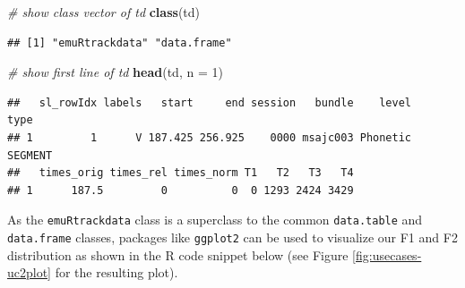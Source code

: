 \documentclass[]{book}
\newenvironment{Shaded}{\begin{snugshade}}{\end{snugshade}}
\newcommand{\CommentTok}[1]{\textcolor[rgb]{0.56,0.35,0.01}{\textit{#1}}}
\newcommand{\DataTypeTok}[1]{\textcolor[rgb]{0.13,0.29,0.53}{#1}}
\newcommand{\DecValTok}[1]{\textcolor[rgb]{0.00,0.00,0.81}{#1}}
\newcommand{\KeywordTok}[1]{\textcolor[rgb]{0.13,0.29,0.53}{\textbf{#1}}}
\newcommand{\NormalTok}[1]{#1}
\newcommand{\OperatorTok}[1]{\textcolor[rgb]{0.81,0.36,0.00}{\textbf{#1}}}
\newcommand{\OtherTok}[1]{\textcolor[rgb]{0.56,0.35,0.01}{#1}}
\newcommand{\StringTok}[1]{\textcolor[rgb]{0.31,0.60,0.02}{#1}}
\begin{document}
\begin{Shaded}
\begin{Highlighting}[]
\CommentTok{# show class vector of td}
\KeywordTok{class}\NormalTok{(td)}
\end{Highlighting}
\end{Shaded}

\begin{verbatim}
## [1] "emuRtrackdata" "data.frame"
\end{verbatim}

\begin{Shaded}
\begin{Highlighting}[]
\CommentTok{# show first line of td}
\KeywordTok{head}\NormalTok{(td, }\DataTypeTok{n =} \DecValTok{1}\NormalTok{)}
\end{Highlighting}
\end{Shaded}

\begin{verbatim}
##   sl_rowIdx labels   start     end session   bundle    level    type
## 1         1      V 187.425 256.925    0000 msajc003 Phonetic SEGMENT
##   times_orig times_rel times_norm T1   T2   T3   T4
## 1      187.5         0          0  0 1293 2424 3429
\end{verbatim}

As the \texttt{emuRtrackdata} class is a superclass to the common \texttt{data.table} and \texttt{data.frame} classes, packages like \texttt{ggplot2} can be used to visualize our F1 and F2 distribution as shown in the R code snippet below (see Figure \ref{fig:usecases-uc2plot} for the resulting plot).

\begin{Shaded}
\end{Shaded}
\end{document}
